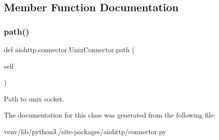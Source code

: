 \subsection{Member Function Documentation}
\mbox{\label{classaiohttp_1_1connector_1_1_unix_connector_a15da4cbb60292fc35f32dcf2c3dbb622}} 
\subsubsection{\texorpdfstring{path()}{path()}}
{\footnotesize\ttfamily def aiohttp.\+connector.\+Unix\+Connector.\+path (\begin{DoxyParamCaption}\item[{}]{self }\end{DoxyParamCaption})}

\begin{DoxyVerb}Path to unix socket.\end{DoxyVerb}
 

The documentation for this class was generated from the following file\+:\begin{DoxyCompactItemize}
\item 
venv/lib/python3./site-\/packages/aiohttp/connector.\+py\end{DoxyCompactItemize}
